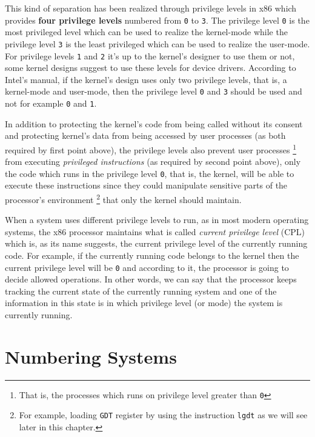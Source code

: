 This kind of separation has been realized through privilege levels in
x86 which provides \textbf{four privilege levels} numbered from
\lstinline!0! to \lstinline!3!. The privilege level \lstinline!0! is the
most privileged level which can be used to realize the kernel-mode while
the privilege level \lstinline!3! is the least privileged which can be
used to realize the user-mode. For privilege levels \lstinline!1! and
\lstinline!2! it's up to the kernel's designer to use them or not, some
kernel designs suggest to use these levels for device drivers. According
to Intel's manual, if the kernel's design uses only two privilege
levels, that is, a kernel-mode and user-mode, then the privilege level
\lstinline!0! and \lstinline!3! should be used and not for example
\lstinline!0! and \lstinline!1!.

In addition to protecting the kernel's code from being called without
its consent and protecting kernel's data from being accessed by user
processes (as both required by first point above), the privilege levels
also prevent user processes \footnote{That is, the processes which runs
  on privilege level greater than \lstinline!0!} from executing
\emph{privileged instructions} (as required by second point above), only
the code which runs in the privilege level \lstinline!0!, that is, the
kernel, will be able to execute these instructions since they could
manipulate sensitive parts of the processor's environment \footnote{For
  example, loading \lstinline!GDT! register by using the instruction
  \lstinline!lgdt! as we will see later in this chapter.} that only the
kernel should maintain.

When a system uses different privilege levels to run, as in most modern
operating systems, the x86 processor maintains what is called
\emph{current privilege level} (CPL) which is, as its name suggests, the
current privilege level of the currently running code. For example, if
the currently running code belongs to the kernel then the current
privilege level will be \lstinline!0! and according to it, the processor
is going to decide allowed operations. In other words, we can say that
the processor keeps tracking the current state of the currently running
system and one of the information in this state is in which privilege
level (or mode) the system is currently running.

\section{Numbering Systems}\label{numbering-systems}

